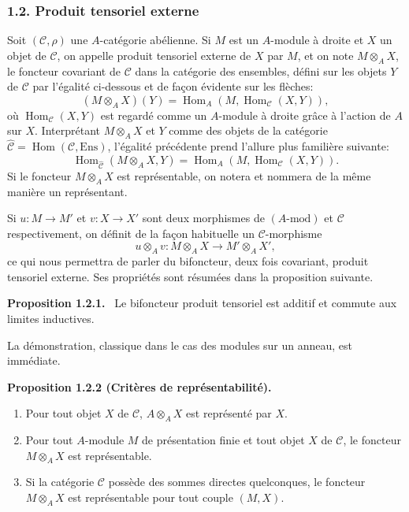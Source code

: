 \documentclass[11pt]{article}
\newenvironment{statement}[1]{\par\medskip\noindent\textbf{#1.}\ }{\par\medskip}
\DeclareMathOperator{\Hom}{Hom}
\providecommand{\Hom}{\operatorname{Hom}}
\providecommand{\Ens}{\mathrm{Ens}}
\providecommand{\cC}{\mathcal C}
\providecommand{\Ens}{\operatorname{Ens}}
\begin{document}
\subsubsection*{1.2. Produit tensoriel externe}
Soit $(\cC,\rho)$ une $A$-catégorie abélienne. Si $M$ est un $A$-module à droite et $X$ un objet de $\cC$, on appelle produit tensoriel externe de $X$ par $M$, et on note $M\otimes_A X$, le foncteur covariant de $\cC$ dans la catégorie des ensembles, défini sur les objets $Y$ de $\cC$ par l'égalité ci-dessous et de façon évidente sur les flèches:
\[
(M\otimes_A X)(Y)=\Hom_A(M,\Hom_{\cC}(X,Y)),
\]
où $\Hom_{\cC}(X,Y)$ est regardé comme un $A$-module à droite grâce à l'action de $A$ sur $X$. Interprétant $M\otimes_AX$ et $Y$ comme des objets de la catégorie $\widehat{\cC}=\Hom(\cC,\Ens)$, l'égalité précédente prend l'allure plus familière suivante:
\[
\Hom_{\widehat{\cC}}(M\otimes_A X,Y)=\Hom_A(M,\Hom_{\cC}(X,Y)).
\]
Si le foncteur $M\otimes_A X$ est représentable, on notera et nommera de la même manière un représentant.

Si $u:M\to M'$ et $v:X\to X'$ sont deux morphismes de $(A\text{-mod})$ et $\cC$ respectivement, on définit de la façon habituelle un $\cC$-morphisme
\[
u\otimes_A v:M\otimes_A X\longrightarrow M'\otimes_A X',
\]
ce qui nous permettra de parler du bifoncteur, deux fois covariant, produit tensoriel externe. Ses propriétés sont résumées dans la proposition suivante.

\begin{statement}{Proposition 1.2.1}
Le bifoncteur produit tensoriel est additif et commute aux limites inductives.
\end{statement}
La démonstration, classique dans le cas des modules sur un anneau, est immédiate.

\begin{statement}{Proposition 1.2.2 (Critères de représentabilité)}
\begin{enumerate}[label=(\alph*)]
\item Pour tout objet $X$ de $\cC$, $A\otimes_AX$ est représenté par $X$.
\item Pour tout $A$-module $M$ de présentation finie et tout objet $X$ de $\cC$, le foncteur $M\otimes_AX$ est représentable.
\item Si la catégorie $\cC$ possède des sommes directes quelconques, le foncteur $M\otimes_A X$ est représentable pour tout couple $(M,X)$.
\end{enumerate}
\end{statement}
\end{document}
